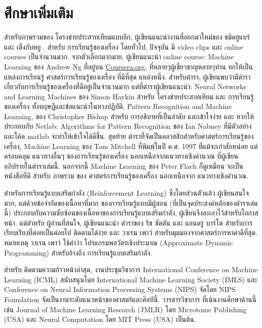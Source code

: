 \section{ศึกษาเพิ่มเติม}
\label{further studies}

สำหรับภาพรวมของ โครงข่ายประสาทเทียมแบบลึก, ผู้เขียนแนะนำงานที่ออกมาใหม่ของ ชมิดฮูแบร์ และ เติ้งกับหยู \cite{Schmidhuber2015a, DengYu2014a}.
%
สำหรับ การเรียนรู้ของเครื่อง โดยทั่วไป, 
ปัจจุบัน มี video clips และ online courses เป็นจำนวนมาก.
จากตัวเลือกมากมาย, ผู้เขียนแนะนำ online course: Machine Learning ของ Andrew Ng\cite{Ng2013a} ที่อยู่บน \url{Coursera.org}, ที่หลายๆผู้เชี่ยวชาญหลายๆท่าน ยกให้เป็นแหล่งการเรียนรู้ ศาสตร์การเรียนรู้ของเครื่อง ที่ดีที่สุด แหล่งหนึ่ง.
สำหรับตำรา, ผู้เขียนพบว่ามีตำราเกี่ยวกับการเรียนรู้ของเครื่องที่ดีอยู่เป็นจำนวนมาก แต่ที่ตำราผู้เขียนแนะนำ:
Neural Networks and Learning Machines ของ Simon Haykin\cite{Haykin2009a} สำหรับ โครงข่ายประสาทเทียม และ การเรียนรู้ของเครื่อง ทั้งทฤษฎีและข้อแนะนำในทางปฏิบัติ,
Pattern Recognition and Machine Learning, ของ Christopher Bishop\cite{Bishop2006a} สำหรับ การอธิบายที่เป็นลำดับ และเข้าใจง่าย และ หากให้ประกอบกับ Netlab: Algorithms for Pattern Recognition ของ Ian Nabney\cite{Nabney2004a} ที่มีตัวอย่างและโค้ด matlab จะทำให้เข้าใจได้ดีขึ้น.
สุดท้าย ตำราที่จัดเป็นคลาสสิกสำหรับศาสตร์การเรียนรู้ของเครื่อง, Machine Learning ของ Tom Mitchell \cite{Mitchell1997a} ที่พิมพ์ในปี ค.ศ. 1997 ที่แม้จะเก่าสักหน่อย แต่ครอบคลุม แนวทางอื่นๆ ของการเรียนรู้ของเครื่อง นอกเหนือจากแนวทางเชิงคำนวณ ที่ผู้เขียนอภิปรายในตำราเล่มนี้.
นอกจากนี้ Machine Learning ของ Peter Flach\cite{Flach2012a} ก็ดูเหมือน จะเป็นหนังสือที่ดี สำหรับ ภาพรวม ของ ศาสตร์การเรียนรู้ของเครื่อง นอกเหนือจาก แนวทางเชิงคำนวณ.

สำหรับการเรียนรู้แบบเสริมกำลัง (Reinforcement Learning) ซึ่งโดยส่วนตัวแล้ว ผู้เขียนสนใจมาก, แต่ด้วยข้อจำกัดของเนื้อหาที่มาก ของการเรียนรู้แบบมีผู้สอน (ที่เป็นจุดประสงค์หลักของตำราเล่มนี้) ประกอบกับความซับซ้อนของเนื้อหาของการเรียนรู้แบบเสริมกำลัง, 
ผู้เขียนจึงละเอาไว้สำหรับโอกาสหน้า.
แต่สำหรับ ผู้อ่านที่สนใจ, ผู้เขียนแนะนำ ตำราของ ริช ซัตตัน และ แอนดรู บาร์โต \cite{SuttonBarto1998a} สำหรับการเรียบเรียงที่ค่อยเป็นค่อยไป ติดตามได้ง่าย
และ วาเรน เพาว์\cite{Powell2011a} สำหรับมุมมองจากศาสตร์การหาค่าดีที่สุด.
หมายเหตุ วาเรน เพาว์\cite{Powell2011a} ใช้คำว่า โปรแกรมพลวัตรเชิงประมาณ (Approximate Dynamic Programming) สำหรับอ้างถึง การเรียนรู้แบบเสริมกำลัง.

สำหรับ ติดตามความก้าวหน้าล่าสุด, งานประชุมวิชาการ International Conference on Machine Learning (ICML) สนับสนุนโดย International Machine Learning Society (IMLS) และ Conference on Neural Information Processing Systems (NIPS) จัดโดย NIPS Foundation จัดเป็นงานระดับแนวหน้าของศาสตร์และศิลป์นี้.
วารสารวิชาการ ที่เน้นงานศึกษาด้านนี้ เช่น Journal of Machine Learning Research (JMLR) โดย Microtome Publishing (USA) และ Neural Computation โดย MIT Press (USA) เป็นต้น.

